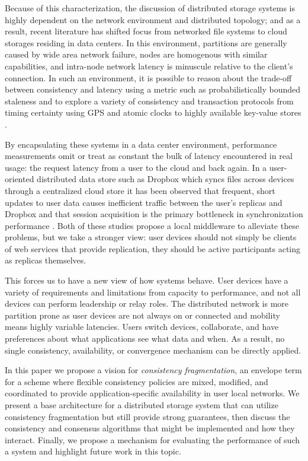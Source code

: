 \documentclass[letterpaper,twocolumn,10pt]{article}
\begin{document}
Because of this characterization, the discussion of distributed storage systems is highly dependent on the network environment and distributed topology; and as a result, recent literature has shifted focus from networked file systems to cloud storages residing in data centers. In this environment, partitions are generally caused by wide area network failure, nodes are homogenous with similar capabilities, and intra-node network latency is minuscule relative to the client's connection. In such an environment, it is possible to reason about the trade-off between consistency and latency using a metric such as probabilistically bounded staleness \cite{bailis_quantifying_2014} and to explore a variety of consistency and transaction protocols from timing certainty using GPS and atomic clocks \cite{corbett_spanner_2013} to highly available key-value stores \cite{decandia_dynamo_2007}.


By encapsulating these systems in a data center environment, performance measurements omit or treat as constant the bulk of latency encountered in real usage: the request latency from a user to the cloud and back again. In a user-oriented distributed data store such as Dropbox which syncs files across devices through a centralized cloud store it has been observed that frequent, short updates to user data causes inefficient traffic between the user's replicas and Dropbox \cite{li_efficient_2013} and that session acquisition is the primary bottleneck in synchronization performance \cite{drago_inside_2012}. Both of these studies propose a local middleware to alleviate these problems, but we take a stronger view: user devices should not simply be clients of web services that provide replication, they should be active participants acting as replicas themselves.

This forces us to have a new view of how systems behave. User devices have a variety of requirements and limitations from capacity to performance, and not all devices can perform leadership or relay roles. The distributed network is more partition prone as user devices are not always on or connected and mobility means highly variable latencies. Users switch devices, collaborate, and have preferences about what applications see what data and when. As a result, no single consistency, availability, or convergence mechanism can be directly applied.

In this paper we propose a vision for \textit{consistency fragmentation}, an envelope term for a scheme where flexible consistency policies are mixed, modified, and coordinated to provide application-specific availability in user local networks. We present a base architecture for a distributed storage system that can utilize consistency fragmentation but still provide strong guarantees, then discuss the consistency and consensus algorithms that might be implemented and how they interact. Finally, we propose a mechanism for evaluating the performance of such a system and highlight future work in this topic.
\end{document}
